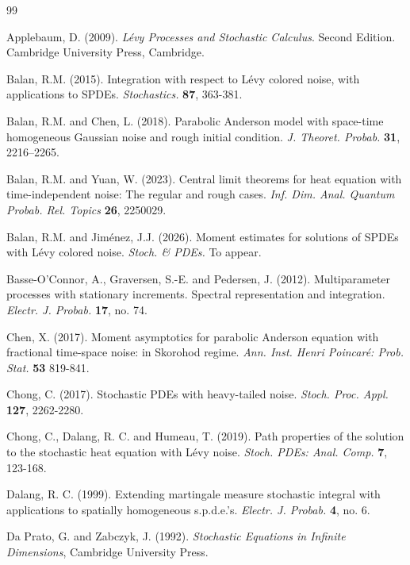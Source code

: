 \documentclass[12pt]{article}
\begin{document}
\begin{thebibliography}{99}

 Applebaum, D. (2009). {\em L\'evy Processes and Stochastic Calculus}. Second Edition. Cambridge University Press, Cambridge.


 Balan, R.M. (2015). Integration with respect to L\'evy colored noise, with applications to SPDEs.
{\em Stochastics.} {\bf 87}, 363-381.



 Balan, R.M. and Chen, L. (2018). Parabolic Anderson model with space-time homogeneous
Gaussian noise and rough initial condition. {\em J. Theoret. Probab.} {\bf 31}, 2216–2265.

 Balan, R.M. and Yuan, W. (2023). Central limit theorems for heat equation with time-independent
noise: The regular and rough cases. {\em Inf. Dim. Anal. Quantum Probab. Rel. Topics}
{\bf 26}, 2250029.


 Balan, R.M. and Jim\'enez, J.J. (2026). Moment estimates for solutions of SPDEs with Lévy colored noise. {\em Stoch. \& PDEs.} To appear. 

 Basse-O'Connor, A., Graversen, S.-E. and Pedersen, J. (2012). Multiparameter processes with stationary increments. Spectral representation and integration. {\em Electr. J. Probab.} {\bf 17}, no. 74. %
    
 Chen, X. (2017). Moment asymptotics for parabolic Anderson equation with fractional time-space noise: in Skorohod regime. {\em Ann. Inst. Henri Poincar\'e: Prob. Stat.} {\bf 53} 819-841.    

 Chong, C. (2017). Stochastic PDEs with heavy-tailed noise. {\em Stoch. Proc. Appl.} {\bf 127}, 2262-2280.
    
 Chong, C., Dalang, R. C. and Humeau, T. (2019). Path properties of the solution to the stochastic heat equation with L\'evy noise. {\em Stoch. PDEs: Anal. Comp.} {\bf 7}, 123-168.
    
 Dalang, R. C. (1999). Extending martingale
measure stochastic integral with applications to spatially
homogeneous s.p.d.e.'s. {\em Electr. J. Probab.} {\bf 4}, no. 6.
 
 Da Prato, G. and Zabczyk, J. (1992).
{\em Stochastic Equations in Infinite Dimensions}, Cambridge
University Press.


\end{thebibliography}
\end{document}
